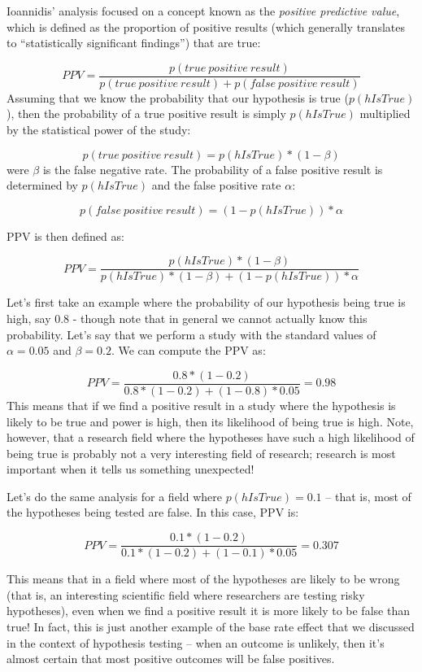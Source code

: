 \documentclass[12pt,]{book}
\theoremstyle{definition}
\theoremstyle{definition}
\theoremstyle{definition}
\theoremstyle{remark}
\begin{document}
Ioannidis' analysis focused on a concept known as the \emph{positive predictive value}, which is defined as the proportion of positive results (which generally translates to ``statistically significant findings'') that are true:

\[
PPV = \frac{p(true\ positive\ result)}{p(true\ positive\ result) + p(false\ positive\ result)}
\]
Assuming that we know the probability that our hypothesis is true (\(p(hIsTrue)\)), then the probability of a true positive result is simply \(p(hIsTrue)\) multiplied by the statistical power of the study:

\[
p(true\ positive\ result) = p(hIsTrue) * (1 - \beta)
\]
were \(\beta\) is the false negative rate. The probability of a false positive result is determined by \(p(hIsTrue)\) and the false positive rate \(\alpha\):

\[
p(false\ positive\ result) = (1 - p(hIsTrue)) * \alpha
\]

PPV is then defined as:

\[
PPV = \frac{p(hIsTrue) * (1 - \beta)}{p(hIsTrue) * (1 - \beta) + (1 - p(hIsTrue)) * \alpha}
\]

Let's first take an example where the probability of our hypothesis being true is high, say 0.8 - though note that in general we cannot actually know this probability. Let's say that we perform a study with the standard values of \(\alpha=0.05\) and \(\beta=0.2\). We can compute the PPV as:

\[
PPV = \frac{0.8 * (1 - 0.2)}{0.8 * (1 - 0.2) + (1 - 0.8) * 0.05} = 0.98
\]
This means that if we find a positive result in a study where the hypothesis is likely to be true and power is high, then its likelihood of being true is high. Note, however, that a research field where the hypotheses have such a high likelihood of being true is probably not a very interesting field of research; research is most important when it tells us something unexpected!

Let's do the same analysis for a field where \(p(hIsTrue)=0.1\) -- that is, most of the hypotheses being tested are false. In this case, PPV is:

\[
PPV = \frac{0.1 * (1 - 0.2)}{0.1 * (1 - 0.2) + (1 - 0.1) * 0.05} = 0.307
\]

This means that in a field where most of the hypotheses are likely to be wrong (that is, an interesting scientific field where researchers are testing risky hypotheses), even when we find a positive result it is more likely to be false than true! In fact, this is just another example of the base rate effect that we discussed in the context of hypothesis testing -- when an outcome is unlikely, then it's almost certain that most positive outcomes will be false positives.
\end{document}
